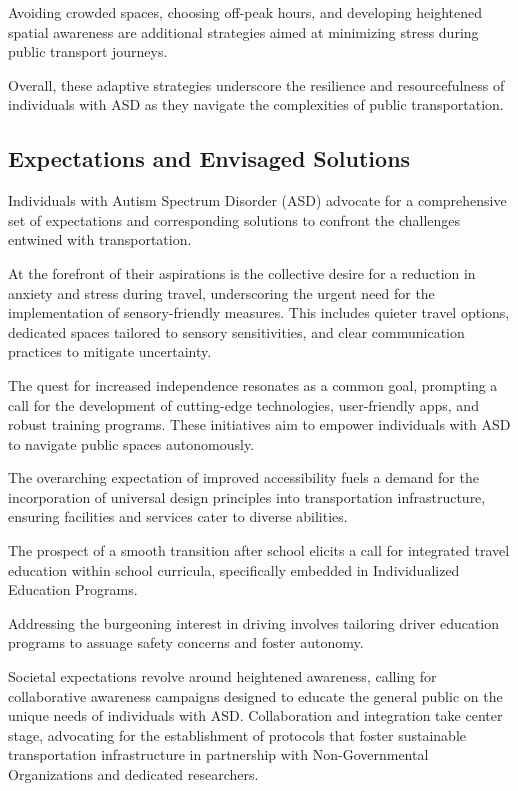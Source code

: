    Avoiding crowded spaces, choosing off-peak hours, and developing heightened spatial awareness are additional strategies aimed at minimizing stress during public transport journeys. 
   
   Overall, these adaptive strategies underscore the resilience and resourcefulness of individuals with ASD as they navigate the complexities of public transportation.

\subsection{Expectations and Envisaged Solutions}

    Individuals with Autism Spectrum Disorder (ASD) advocate for a comprehensive set of expectations and corresponding solutions to confront the challenges entwined with transportation. 
    
    At the forefront of their aspirations is the collective desire for a reduction in anxiety and stress during travel, underscoring the urgent need for the implementation of sensory-friendly measures. This includes quieter travel options, dedicated spaces tailored to sensory sensitivities, and clear communication practices to mitigate uncertainty. 
    
    The quest for increased independence resonates as a common goal, prompting a call for the development of cutting-edge technologies, user-friendly apps, and robust training programs. These initiatives aim to empower individuals with ASD to navigate public spaces autonomously. 
    
    The overarching expectation of improved accessibility fuels a demand for the incorporation of universal design principles into transportation infrastructure, ensuring facilities and services cater to diverse abilities. 
    
    The prospect of a smooth transition after school elicits a call for integrated travel education within school curricula, specifically embedded in Individualized Education Programs. 
    
    Addressing the burgeoning interest in driving involves tailoring driver education programs to assuage safety concerns and foster autonomy. 
    
    Societal expectations revolve around heightened awareness, calling for collaborative awareness campaigns designed to educate the general public on the unique needs of individuals with ASD. Collaboration and integration take center stage, advocating for the establishment of protocols that foster sustainable transportation infrastructure in partnership with Non-Governmental Organizations and dedicated researchers. 
    
